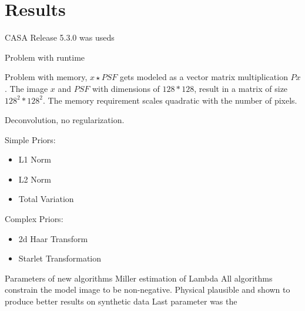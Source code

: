 \section{Results}

CASA Release 5.3.0 was useds

Problem with runtime

Problem with memory, $x \star PSF$ gets modeled as a vector matrix multiplication $Px$. The image $x$ and $PSF$ with dimensions of $128 * 128$, result in a matrix of size $128^2 * 128^2$. The memory requirement scales quadratic with the number of pixels. 


Deconvolution, no regularization.

Simple Priors:
\begin{itemize}
	\item L1 Norm
	\item L2 Norm
	\item Total Variation
\end{itemize}

Complex Priors:
\begin{itemize}
	\item 2d Haar Transform
	\item Starlet Transformation
\end{itemize}

Parameters of new algorithms
Miller estimation of Lambda \cite{miller1970least}
All algorithms constrain the model image to be non-negative. Physical plausible and shown to produce better results on synthetic data \cite{mcewen2011compressed}
Last parameter was the 


